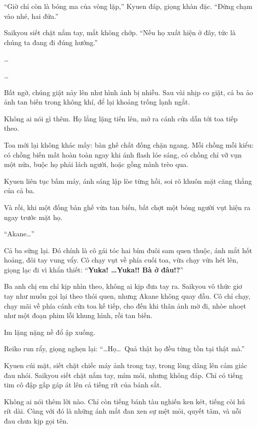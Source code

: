 \documentclass[../main.tex]{subfiles}
\begin{document}
``Giờ chỉ còn là bóng ma của vòng lặp,'' Kyuen đáp, giọng khàn đặc. ``Đừng chạm vào nhé, hai đứa.''

Saikyou siết chặt nắm tay, mắt không chớp. ``Nếu họ xuất hiện ở đây, tức là chúng ta đang đi đúng hướng.''

\dots

\dots

Bất ngờ, chúng giật nảy lên như hình ảnh bị nhiễu. Sau vài nhịp co giật, cả ba ảo ảnh tan biến trong không khí, để lại khoảng trống lạnh ngắt.

Không ai nói gì thêm. Họ lẳng lặng tiến lên, mở ra cánh cửa dẫn tới toa tiếp theo.

\ct

Toa mới lại không khác mấy: bàn ghế chất đống chặn ngang. Mỗi chồng mỗi kiểu: có chồng biến mất hoàn toàn ngay khi ánh flash lóe sáng, có chồng chỉ vỡ vụn một nửa, buộc họ phải lách người, hoặc gồng mình trèo qua.

Kyuen liên tục bấm máy, ánh sáng lập lòe từng hồi, soi rõ khuôn mặt căng thẳng của cả ba.

Và rồi, khi một đống bàn ghế vừa tan biến, bất chợt một bóng người vụt hiện ra ngay trước mặt họ.

``Akane\dots''

Cả ba sững lại. Đó chính là cô gái tóc hai bím đuôi sam quen thuộc, ánh mắt hốt hoảng, đôi tay vung vẩy. Cô chạy vụt về phía cuối toa, vừa chạy vừa hét lên, giọng lạc đi vì khẩn thiết: ``\textbf{Yuka! \dots Yuka!! Bà ở đâu!?}''

Ba anh chị em chỉ kịp nhìn theo, không ai kịp đưa tay ra. Saikyou vô thức giơ tay như muốn gọi lại theo thói quen, nhưng Akane không quay đầu. Cô chỉ chạy, chạy mãi về phía cánh cửa toa kế tiếp, cho đến khi thân ảnh mờ đi, nhòe nhoẹt như một đoạn phim lỗi khung hình, rồi tan biến.

Im lặng nặng nề đổ ập xuống.

Reiko run rẩy, giọng nghẹn lại: ``\dots Họ\dots\ Quả thật họ đều từng tồn tại thật mà.''

Kyuen cúi mặt, siết chặt chiếc máy ảnh trong tay, trong lòng dâng lên cảm giác đau nhói. Saikyou siết chặt nắm tay, mím môi, nhưng không đáp. Chỉ có tiếng tim cô đập gấp gáp át lên cả tiếng rít của bánh sắt.

Không ai nói thêm lời nào. Chỉ còn tiếng bánh tàu nghiến ken két, tiếng còi hú rít dài. Cùng với đó là những ánh mắt đan xen sự mệt mỏi, quyết tâm, và nỗi đau chưa kịp gọi tên.

\ct
\end{document}
